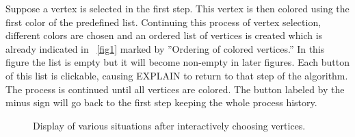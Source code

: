 \documentclass[11pt, twoside,a4paper]{book}
\begin{document}
Suppose a vertex is selected in the first step. This vertex is then colored using the first color of the predefined list. Continuing this process of vertex selection, different colors are chosen and an ordered list of vertices is created which is already indicated in \figurename~\ref{fig1} marked by ''Ordering of colored vertices.'' In this figure the list is empty but it will become non-empty in later figures. Each button of this list is clickable, causing \mbox{EXPLAIN} to return to that step of the algorithm. The process is continued until all vertices are colored. The button labeled by the minus sign will go back to the first step keeping the whole process history.


\begin{figure}
\centering
{}
\centering
{}
\centering
{}
\centering
{}
\caption{Display of various situations after interactively choosing vertices.}
\label{algorihtm}
\end{figure}
\end{document}

